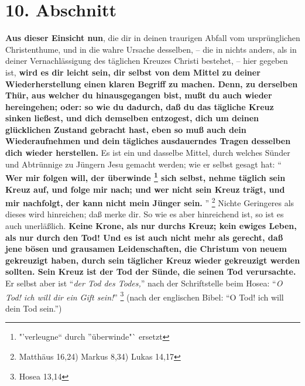 \section{10. Abschnitt}  \label{kap2_ab10}

\textbf{Aus dieser Einsicht nun}, die dir in deinen traurigen Abfall vom ursprünglichen
Christenthume, und in die wahre Ursache desselben, -- die in nichts anders, als
in deiner Vernachlässigung des täglichen Kreuzes Christi bestehet, -- hier
gegeben ist, \textbf{wird es dir leicht sein, dir selbst von dem Mittel zu deiner
Wiederherstellung einen klaren Begriff zu machen. Denn, zu derselben Thür, aus
welcher du hinausgegangen bist, mußt du auch wieder hereingehen; oder: so wie du
dadurch, daß du das tägliche Kreuz sinken ließest, und dich demselben entzogest,
dich um deinen glücklichen Zustand gebracht hast, eben so muß auch dein
Wiederaufnehmen und dein tägliches ausdauerndes Tragen desselben dich wieder
herstellen.} Es ist ein und dasselbe Mittel, durch welches Sünder und Abtrünnige
zu Jüngern Jesu gemacht werden; wie er selbst gesagt hat: "` \textbf{Wer mir
folgen will, der überwinde \footnote{"'verleugne"` durch "'überwinde"` ersetzt}
sich selbst, nehme täglich sein Kreuz auf, und folge
mir nach; und wer nicht sein Kreuz trägt, und mir nachfolgt, der kann nicht mein
Jünger sein.} "' \footnote{Matthäus 16,24) Markus 8,34) Lukas 14,17}
 
 Nichte
Geringeres als dieses wird hinreichen; daß merke dir. So wie es aber hinreichend
ist, so ist es auch unerläßlich. \textbf{Keine Krone, als nur durchs Kreuz;
kein ewiges Leben, als nur durch den Tod!
Und es ist auch nicht mehr als gerecht, daß jene
bösen und grausamen Leidenschaften, die Christum von neuem gekreuzigt haben,
durch sein täglicher Kreuz wieder gekreuzigt werden sollten. Sein Kreuz ist der
Tod der Sünde, die seinen Tod verursachte.} Er selbst aber ist
"`\textit{der Tod des Todes,}"' nach der Schriftstelle beim Hosea:
"`\textit{O Tod! ich will dir ein Gift sein!}"' \footnote{Hosea 13,14}
 (nach der englischen Bibel: "`O Tod! ich will dein
Tod sein."')

